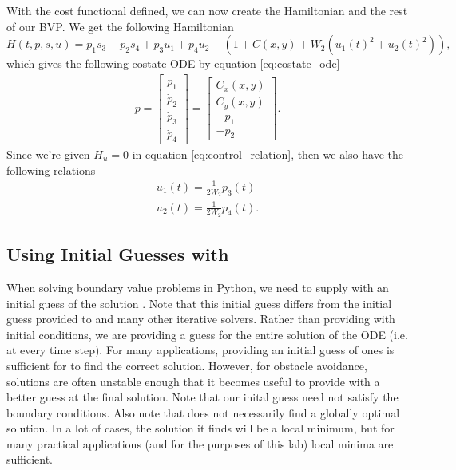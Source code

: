 With the cost functional defined, we can now create the Hamiltonian and the rest of our BVP.
We get the following Hamiltonian
\begin{equation}\label{eq:ex-Hamiltonian}
    H(t,p,s,u) = p_1s_3 + p_2s_4 + p_3u_1 + p_4u_2 - \left(1 + C(x,y) + W_2\left(u_1(t)^2+u_2(t)^2\right) \right),
\end{equation}
which gives the following costate ODE by equation \ref{eq:costate_ode}
\begin{equation}\label{eq:ex-costate-odes}
    \begin{aligned}
        \dot{p} =
        \begin{bmatrix}
            \dot{p}_1 \\
            \dot{p}_2 \\
            \dot{p}_3 \\
            \dot{p}_4
        \end{bmatrix} =
        \begin{bmatrix}
            C_x(x,y) \\
            C_y(x,y) \\
            -p_1 \\
            -p_2
        \end{bmatrix}.
    \end{aligned}
\end{equation}
Since we're given $H_u = 0$ in equation \ref{eq:control_relation}, then we also have the following relations
\begin{equation}\label{eq:ex-equality-constraints}
    \begin{aligned}
    u_1(t) = \frac{1}{2W_2}p_3(t) \\
    u_2(t) = \frac{1}{2W_2}p_4(t).
    \end{aligned}
\end{equation}

\subsection*{Using Initial Guesses with }
When solving boundary value problems in Python, we need to supply  with an initial guess  of the solution .
Note that this initial guess  differs from the initial guess provided to  and many other iterative solvers.
Rather than providing  with initial conditions, we are providing a guess for the entire solution of the ODE (i.e. at every time step). 
For many applications, providing an initial guess of ones is sufficient for  to find the correct solution. 
However, for obstacle avoidance, solutions are often unstable enough that it becomes useful to provide  with a better guess at the final solution. 
Note that our inital guess need not satisfy the boundary conditions.
Also note that  does not necessarily find a globally optimal solution.
In a lot of cases, the solution it finds will be a local minimum, but for many practical applications (and for the purposes of this lab) local minima are sufficient.

